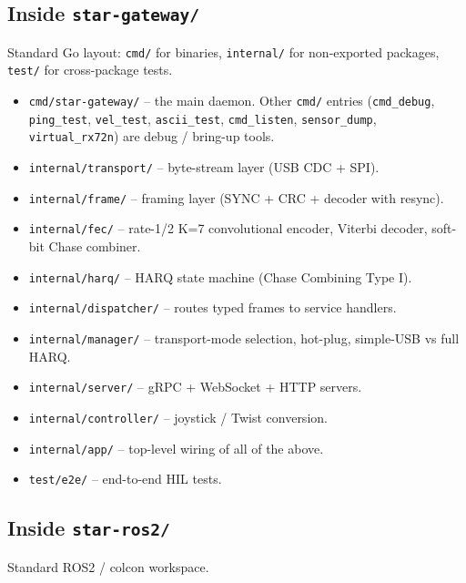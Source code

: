 \subsection{Inside \texttt{star-gateway/}}

Standard Go layout: \texttt{cmd/} for binaries, \texttt{internal/} for
non-exported packages, \texttt{test/} for cross-package tests.

\begin{itemize}
  \item \texttt{cmd/star-gateway/} -- the main daemon. Other
        \texttt{cmd/} entries (\texttt{cmd\_debug}, \texttt{ping\_test},
        \texttt{vel\_test}, \texttt{ascii\_test}, \texttt{cmd\_listen},
        \texttt{sensor\_dump}, \texttt{virtual\_rx72n}) are debug /
        bring-up tools.
  \item \texttt{internal/transport/} -- byte-stream layer (USB CDC + SPI).
  \item \texttt{internal/frame/} -- framing layer (SYNC + CRC + decoder
        with resync).
  \item \texttt{internal/fec/} -- rate-1/2 K=7 convolutional encoder,
        Viterbi decoder, soft-bit Chase combiner.
  \item \texttt{internal/harq/} -- HARQ state machine (Chase Combining
        Type I).
  \item \texttt{internal/dispatcher/} -- routes typed frames to service
        handlers.
  \item \texttt{internal/manager/} -- transport-mode selection,
        hot-plug, simple-USB vs full HARQ.
  \item \texttt{internal/server/} -- gRPC + WebSocket + HTTP servers.
  \item \texttt{internal/controller/} -- joystick / Twist conversion.
  \item \texttt{internal/app/} -- top-level wiring of all of the above.
  \item \texttt{test/e2e/} -- end-to-end HIL tests.
\end{itemize}

\subsection{Inside \texttt{star-ros2/}}

Standard ROS2 / colcon workspace.

